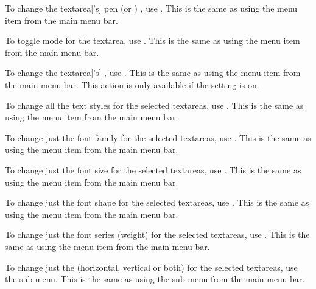To change the \gls{textarea}['s] pen (or ) , use
. This is the same as using the
 menu item from the main menu bar.


To toggle  mode for the \gls{textarea}, use .
This is the same as using the  menu item
from the main menu bar.


To change the \gls{textarea}['s] , use
. This is the same as using the
 menu item from the main menu bar.
This action is only available if the  setting is on.


To change all the text styles for the selected \glspl{textarea},
use . This is the same as using the
 menu item from the main menu bar.


To change just the font family for the selected \glspl{textarea},
use . This is the same as using the
 menu item from the main menu bar.


To change just the font size for the selected \glspl{textarea},
use . This is the same as using the
 menu item from the main menu bar.


To change just the font shape for the selected \glspl{textarea},
use . This is the same as using the
 menu item from the main menu bar.


To change just the font series (weight) for the selected \glspl{textarea},
use . This is the same as using the
 menu item from the main menu bar.


To change just the  (horizontal, vertical or both) for the
selected \glspl{textarea}, use the 
sub-menu. This is the same as using the
 sub-menu from the main menu
bar.

